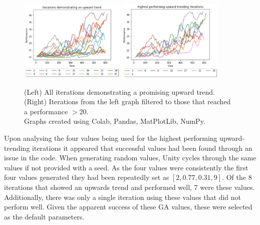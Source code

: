 \documentclass{article}
\begin{document}
\begin{figure}[H]
\centering
\includegraphics[width=0.45\textwidth]{gaPatternIterations}
\includegraphics[width=0.45\textwidth]{gafilteredIterations}
\caption{(Left) All iterations demonstrating a promising upward trend.\\
(Right) Iterations from the left graph filtered to those that reached a performance $>20$.\\
Graphs created using Colab, \citep{colab} Pandas, \citep{pd} MatPlotLib, \citep{plt} NumPy. \citep{np}}
\end{figure}

Upon analysing the four values being used for the highest performing upward-trending iterations it appeared that successful values had been found through an issue in the code. When generating random values, Unity cycles through the same values if not provided with a seed.  As the four values were consistently the first four values generated they had been repeatedly set as $[2, 0.77, 0.31, 9]$. Of the 8 iterations that showed an upwards trend and performed well, 7 were these values. Additionally, there was only a single iteration using these values that did not perform well. Given the apparent success of these GA values, these were selected as the default parameters. \\
\end{document}
